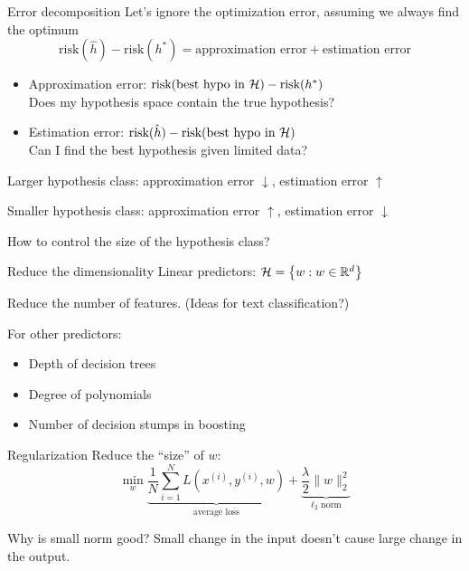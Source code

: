 \documentclass[usenames,dvipsnames,notes,11pt,aspectratio=169]{beamer}
\newcommand{\pdfnote}[1]{}
\begin{document}
\begin{frame}
    {Error decomposition}
    Let's ignore the optimization error, assuming we always find the optimum
$$
        \text{risk}(\hat{h}) - \text{risk}(h^*) = \text{approximation error} + \text{estimation error}
        $$
        \vspace{-3em}
    \begin{itemize}
        \itemsep1em
        \item Approximation error:
            $\text{risk}(\text{best hypo in $\mathcal{H}$}) - \text{risk}(h^*)$ \\
            Does my hypothesis space contain the true hypothesis?
        \item Estimation error:
            $\text{risk}(\hat{h}) - \text{risk}(\text{best hypo in $\mathcal{H}$})$ \\
            Can I find the best hypothesis given limited data?
    \end{itemize}

    \pause
    Larger hypothesis class: approximation error $\downarrow$, estimation error $\uparrow$

    Smaller hypothesis class: approximation error $\uparrow$, estimation error $\downarrow$

    How to control the size of the hypothesis class?
\end{frame}

\begin{frame}
    {Reduce the dimensionality}
    Linear predictors: $\mathcal{H} = \left\{ w : w \in \mathbb{R}^d \right\}$

    Reduce the number of features. (Ideas for text classification?)
    \pdfnote{
        stopwords, stemming, filter by frequency
    }
    \pdfnote{
        feature selection (fwd/bwd), L1
    }

    \pause
    For other predictors:\\
    \begin{itemize}
        \item Depth of decision trees
        \item Degree of polynomials
        \item Number of decision stumps in boosting
    \end{itemize}
\end{frame}

\begin{frame}
    {Regularization}
    Reduce the ``size'' of $w$:
    $$
    \min_w \underbrace{\frac{1}{N}\sum_{i=1}^N L(x^{(i)}, y^{(i)}, w)}_{\textstyle \text{average loss}}
    + \underbrace{\frac{\lambda}{2}\|w\|_2^2}_{\textstyle \ell_2 \text{ norm}}
    $$

    Why is small norm good? Small change in the input doesn't cause large change in the output.

\end{frame}
\end{document}
